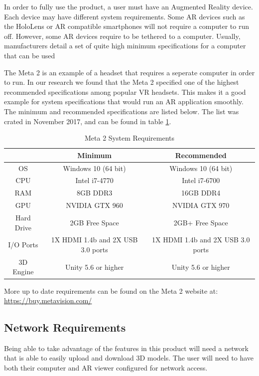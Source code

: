 In order to fully use the product, a user must have an Augmented Reality device.
Each device may have different system requirements. Some AR devices such as the 
HoloLens or AR compatible smartphones will not require a computer to run off. 
However, some AR devices require to be tethered to a computer. Usually, 
manufacturers detail a set of quite high minimum specifications for a computer 
that can be used

The Meta 2 is an example of a headset that requires a seperate computer in order
to run.  In our research we found that the Meta 2 specified one of the highest 
recommended specifications among popular VR headsets. This makes it a good 
example for system specifications that would run an AR application smoothly. 
The minimum and recommended specifications are listed below. The list was crated
in November 2017, and can be found in table 
\ref{table:metatwosystemrequirements}.

\begin{table}[H]
	\centering
	\begin{tabular}{ | c | c | c | }
		\hline
		& Minimum & Recommended \\ \hline
		OS & Windows 10 (64 bit) & 	Windows 10 (64 bit) \\ \hline
		CPU & Intel i7-4770 & Intel i7-6700 \\ \hline
		RAM & 8GB DDR3 & 16GB DDR4 \\ \hline
		GPU & NVIDIA GTX 960 & NVIDIA GTX 970 \\ \hline
		Hard Drive & 2GB Free Space & 2GB+ Free Space \\ \hline
		I/O Ports & 1X HDMI 1.4b and 2X USB 3.0 ports & 1X HDMI 1.4b and 2X USB 3.0 ports \\ \hline
		3D Engine & Unity 5.6 or higher & Unity 5.6 or higher \\ \hline
	\end{tabular}

	\caption{Meta 2 System Requirements}
	\label{table:metatwosystemrequirements}
\end{table}

More up to date requirements can be found on the Meta 2 website at: 
\url{https://buy.metavision.com/}

\subsection{Network Requirements}

Being able to take advantage of the features in this product will need a network
that is able to easily upload and download 3D models. The user will need to have
both their computer and AR viewer configured for network access.

